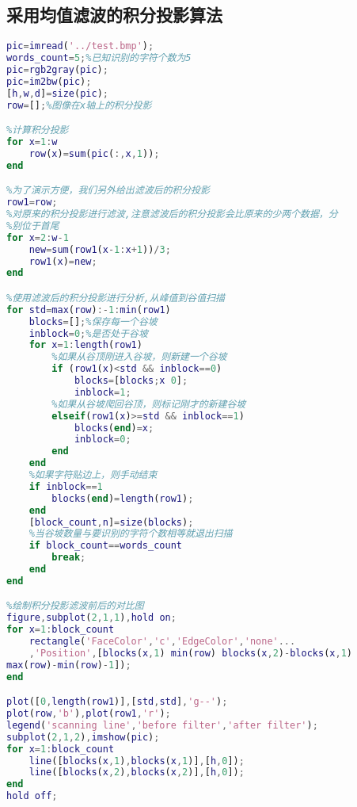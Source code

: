 \subsection{采用均值滤波的积分投影算法}\label{means_filter}
\begin{lstlisting}[caption=采用均值滤波的积分投影算法,language=matlab]
pic=imread('../test.bmp');
words_count=5;%已知识别的字符个数为5
pic=rgb2gray(pic);
pic=im2bw(pic);
[h,w,d]=size(pic);
row=[];%图像在x轴上的积分投影

%计算积分投影
for x=1:w
    row(x)=sum(pic(:,x,1));
end

%为了演示方便，我们另外给出滤波后的积分投影
row1=row;
%对原来的积分投影进行滤波,注意滤波后的积分投影会比原来的少两个数据，分
%别位于首尾 
for x=2:w-1
    new=sum(row1(x-1:x+1))/3;
    row1(x)=new;
end

%使用滤波后的积分投影进行分析,从峰值到谷值扫描
for std=max(row):-1:min(row1)
    blocks=[];%保存每一个谷坡
    inblock=0;%是否处于谷坡
    for x=1:length(row1)
        %如果从谷顶刚进入谷坡，则新建一个谷坡
        if (row1(x)<std && inblock==0)
            blocks=[blocks;x 0];
            inblock=1;
        %如果从谷坡爬回谷顶，则标记刚才的新建谷坡    
        elseif(row1(x)>=std && inblock==1)
            blocks(end)=x;
            inblock=0;
        end
    end
    %如果字符贴边上，则手动结束
    if inblock==1
        blocks(end)=length(row1);
    end
    [block_count,n]=size(blocks);
    %当谷坡数量与要识别的字符个数相等就退出扫描
    if block_count==words_count
        break;
    end
end

%绘制积分投影滤波前后的对比图
figure,subplot(2,1,1),hold on;
for x=1:block_count
    rectangle('FaceColor','c','EdgeColor','none'...
    ,'Position',[blocks(x,1) min(row) blocks(x,2)-blocks(x,1)
max(row)-min(row)-1]);
end

plot([0,length(row1)],[std,std],'g--');
plot(row,'b'),plot(row1,'r');
legend('scanning line','before filter','after filter');
subplot(2,1,2),imshow(pic);
for x=1:block_count
    line([blocks(x,1),blocks(x,1)],[h,0]);
    line([blocks(x,2),blocks(x,2)],[h,0]);
end
hold off;
\end{lstlisting}


